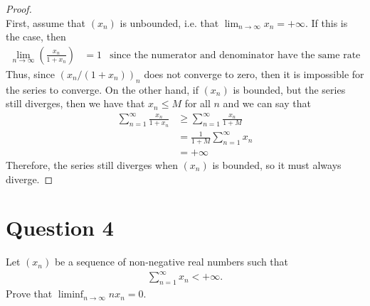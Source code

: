 \documentclass[10pt,a4paper]{article}
\theoremstyle{definition}
\theoremstyle{definition}
\begin{document}
\begin{proof}$ $
\\First, assume that $(x_n)$ is unbounded, i.e. that $\lim_{n \to \infty} x_n = +\infty$. If this is the case, then 
\begin{align*}
\lim_{n \to \infty} \left(\frac{x_n}{1 + x_n} \right) &= 1 &\text{since the numerator and denominator have the same rate of divergence.}
\end{align*}
Thus, since $(x_n/(1 + x_n))_n$ does not converge to zero, then it is impossible for the series to converge. On the other hand, if $(x_n)$ is bounded, but the series still diverges, then we have that $x_n \leq M$ for all $n$ and we can say that 
\begin{align*}
\sum_{n = 1}^\infty \frac{x_n}{1 + x_n} &\geq \sum_{n = 1}^\infty \frac{x_n}{1 + M}\\
&= \frac{1}{1 + M} \sum_{n = 1}^\infty x_n\\
&= +\infty
\end{align*}
Therefore, the series still diverges when $(x_n)$ is bounded, so it must always diverge. 
\end{proof}

\section*{Question 4}
Let $(x_n)$ be a sequence of non-negative real numbers such that
\begin{align*}
\sum_{n = 1}^\infty x_n < +\infty.
\end{align*}
Prove that $\liminf_{n \to \infty} nx_n = 0.$
\end{document}
